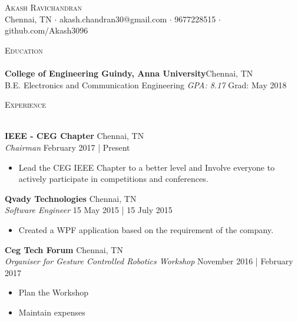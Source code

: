 \documentclass[a4paper]{article}
\newcommand{\lineunder} {
    \vspace*{-8pt} \\
    \hspace*{-18pt} \hrulefill \\
}
\newcommand{\header} [1] {
    {\hspace*{-18pt}\vspace*{6pt} \textsc{#1}}
    \vspace*{-6pt} \lineunder
}
\begin{document}
\vspace*{-40pt}

\vspace*{-10pt}
\begin{center}
	{\Huge \scshape {Akash Ravichandran}}\\
	Chennai, TN $\cdot$ akash.chandran30@gmail.com $\cdot$ 9677228515 $\cdot$ github.com/Akash3096\\
\end{center}

\vspace*{2mm}

\header{Education}
\textbf{College of Engineering Guindy, Anna University}\hfill Chennai, TN\\
B.E. Electronics and Communication Engineering \textit{GPA: 8.17} \hfill Grad: May 2018\\
\vspace{2mm}

\vspace*{2mm}

\header{Experience}
\vspace{1mm}

\textbf{IEEE - CEG Chapter} \hfill Chennai, TN\\
\textit{Chairman} \hfill February 2017 | Present\\
\vspace{-1mm}
\begin{itemize} \itemsep 1pt
	\item Lead the CEG IEEE Chapter to a better level and Involve everyone to actively participate in competitions and conferences.
\end{itemize}

\textbf{Qvady Technologies} \hfill Chennai, TN\\
\textit{Software Engineer} \hfill 15 May 2015 | 15 July 2015\\
\vspace{-1mm}
\begin{itemize} \itemsep 1pt
	\item Created a WPF application based on the requirement of the company.
\end{itemize}

\textbf{Ceg Tech Forum} \hfill Chennai, TN\\
\textit{Organiser for Gesture Controlled Robotics Workshop} \hfill November 2016 | February 2017\\
\vspace{-1mm}
\begin{itemize} \itemsep 1pt
	\item Plan the Workshop
	\item Maintain expenses
\end{itemize}
\end{document}
